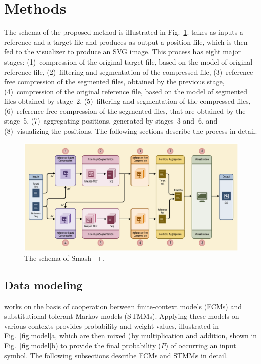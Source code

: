 \clearpage
\section{Methods} \label{sec.methods}
The schema of the proposed method is illustrated in Fig.~\ref{fig.schema}. \smashpp takes as inputs a reference and a target file and produces as output a position file, which is then fed to the \smashpp visualizer to produce an SVG image. This process has eight major stages: (1)~compression of the original target file, based on the model of original reference file, (2)~filtering and segmentation of the compressed file, (3)~reference-free compression of the segmented files, obtained by the previous stage, (4)~compression of the original reference file, based on the model of segmented files obtained by stage~2, (5)~filtering and segmentation of the compressed files, (6)~reference-free compression of the segmented files, that are obtained by the stage~5, (7)~aggregating positions, generated by stages~3 and~6, and (8)~visualizing the positions. The following sections describe the process in detail.

\begin{figure}[!h]
  \includegraphics[width=\linewidth]{schema.pdf}
  \caption{The schema of Smash++.}
  \label{fig.schema}
\end{figure}

\subsection{Data modeling}
\smashpp works on the basis of cooperation between finite-context models (FCMs) and substitutional tolerant Markov models (STMMs). Applying these models on various contexts provides probability and weight values, illustrated in Fig.~\ref{fig.model}a, which are then mixed (by multiplication and addition, shown in Fig.~\ref{fig.model}b) to provide the final probability ($P$) of occurring an input symbol. The following subsections describe FCMs and STMMs in detail.

